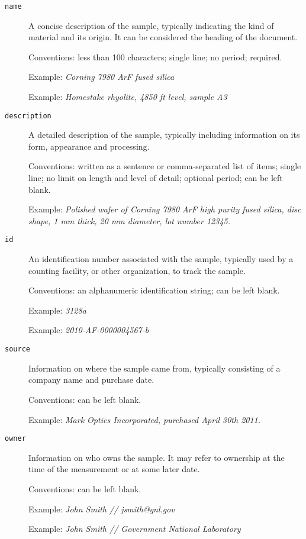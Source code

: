 \documentclass[11pt, letterpaper]{article}
\begin{document}
\begin{description}

  \item[\texttt{name}] A concise description of the sample, typically indicating the kind of material and its origin. It can be considered the heading of the document. 
  
  Conventions: less than 100 characters; single line; no period; required.
  
  Example: \textit{Corning 7980 ArF fused silica}
  
  Example: \textit{Homestake rhyolite, 4850 ft level, sample A3}

  \item[\texttt{description}] A detailed description of the sample, typically including information on its form, appearance and processing. 
  
  Conventions: written as a sentence or comma-separated list of items; single line; no limit on length and level of detail; optional period; can be left blank.
  
  Example: \textit{Polished wafer of Corning 7980 ArF high purity fused silica, disc shape, 1 mm thick, 20 mm diameter, lot number 12345.}

  \item[\texttt{id}] An identification number associated with the sample, typically used by a counting facility, or other organization, to track the sample.
  
  Conventions: an alphanumeric identification string; can be left blank.
  
  Example: \textit{3128a}

  Example: \textit{2010-AF-0000004567-b}

  \item[\texttt{source}] Information on where the sample came from, typically consisting of a company name and purchase date.

  Conventions: can be left blank.
  
  Example: \textit{Mark Optics Incorporated, purchased April 30th 2011.} 
  
  \item[\texttt{owner}] Information on who owns the sample. It may refer to ownership at the time of the measurement or at some later date.

  Conventions: can be left blank.
  
  Example: \textit{John Smith // jsmith@gnl.gov}   

  Example: \textit{John Smith // Government National Laboratory}   
  
\end{description}
\end{document}
